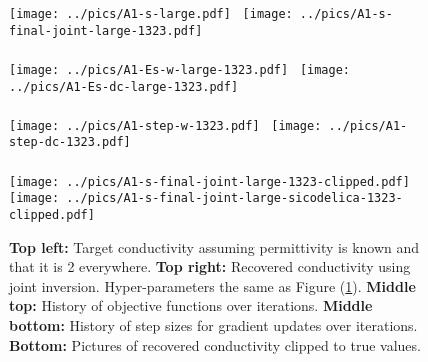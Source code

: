 \documentclass[a4paper,12pt]{article}
\begin{document}
%
\begin{figure}[t!]
\centering
\texttt{[image: ../pics/A1-s-large.pdf]}~
\texttt{[image: ../pics/A1-s-final-joint-large-1323.pdf]}
\\~\\
\texttt{[image: ../pics/A1-Es-w-large-1323.pdf]}~
\texttt{[image: ../pics/A1-Es-dc-large-1323.pdf]}
\\~\\
\texttt{[image: ../pics/A1-step-w-1323.pdf]}~
\texttt{[image: ../pics/A1-step-dc-1323.pdf]}
\\~\\
\texttt{[image: ../pics/A1-s-final-joint-large-1323-clipped.pdf]}~
\texttt{[image: ../pics/A1-s-final-joint-large-sicodelica-1323-clipped.pdf]}
\caption{{\bf Top left:} Target conductivity assuming permittivity is known and that it is 2 everywhere. 
{\bf Top right:} Recovered conductivity using joint inversion. 
Hyper-parameters the same as Figure (\ref{fig:fig2}).  
{\bf Middle top:} History of objective functions over iterations. 
{\bf Middle bottom:} History of step sizes for gradient updates over iterations. 
{\bf Bottom:} Pictures of recovered conductivity clipped to true values.
}
\label{fig:fig2}
\end{figure}
%
%
%
%
\end{document}
